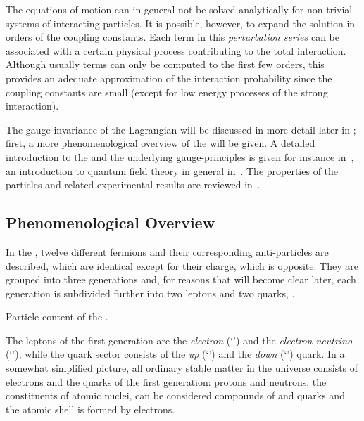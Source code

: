 The equations of motion can in general not be solved analytically for non-trivial systems of interacting particles.
It is possible, however, to expand the solution in orders of the coupling constants.
Each term in this \emph{perturbation series} can be associated with a certain physical process contributing to the total interaction.
Although usually terms can only be computed to the first few orders, this provides an adequate approximation of the interaction probability since the coupling constants are small (except for low energy processes of the strong interaction).

The gauge invariance of the Lagrangian will be discussed in more detail later in ; first, a more phenomenological overview of the \sm will be given.
A detailed introduction to the \sm and the underlying gauge-principles is given for instance in~\cite{bib:Schmuser:FeynmanGraphs,bib:AitchisonHey:GaugeTheories1,bib:AitchisonHey:GaugeTheories2}, an introduction to quantum field theory in general in~\cite{bib:MandlShaw:QFT}.
The properties of the \sm particles and related experimental results are reviewed in~\cite{bib:PDG:2010}.



\subsection{Phenomenological Overview}
In the \sm, twelve different fermions and their corresponding anti-particles are described, which are identical except for their charge, which is opposite.
They are grouped into three generations and, for reasons that will become clear later, each generation is subdivided further into two leptons and two quarks, \cf {}.
\begin{table}[!htb]
\label{tab:Theory:SMParticles}
\caption{Particle content of the \sm.}
\end{table}

The leptons of the first generation are the \emph{electron} (`\lel') and the \emph{electron neutrino} (`\nue'), while the quark sector consists of the \emph{up} (`\qu') and the \emph{down} (`\qd') quark.
In a somewhat simplified picture, all ordinary stable matter in the universe consists of electrons and the quarks of the first generation: protons and neutrons, the constituents of atomic nuclei, can be considered compounds of \qu and \qd quarks and the atomic shell is formed by electrons.

